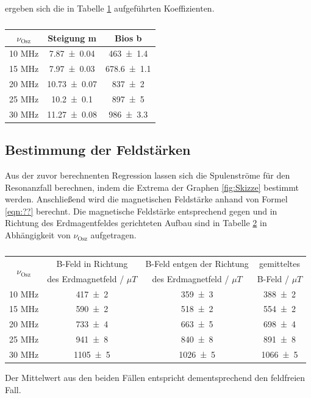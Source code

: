 ergeben sich die in Tabelle \ref{tab:stei} aufgeführten Koeffizienten. 
\begin{table}
  \centering
  \caption{}
  \begin{tabular}{c|c c}
    \toprule
    	$\nu_\text{Osz}$ & Steigung m & Bios b \\
    \midrule
       	10 MHz & \num{7.87 +- 0.04}  & \num{463 +- 1.4} \\
	15 MHz & \num{7.97 +- 0.03}  & \num{678.6 +- 1.1} \\ 
	20 MHz & \num{10.73 +- 0.07} & \num{837 +- 2} \\
	25 MHz & \num{10.2 +- 0.1}   & \num{897 +- 5} \\
	30 MHz & \num{11.27 +- 0.08} & \num{986 +- 3.3}\\
    \bottomrule
  \end{tabular}
  \label{tab:stei}
\end{table}

\subsection{Bestimmung der Feldstärken}
Aus der zuvor berechnenten Regression lassen sich die Spulenströme für den Resonanzfall berechnen, indem die Extrema der Graphen \ref{fig:Skizze} bestimmt werden. Anschließend wird die magnetischen Feldstärke anhand von Formel \ref{eqn:??} berechnt. Die magnetische Feldstärke entsprechend gegen und in Richtung des Erdmagentfeldes gerichteten Aufbau sind in Tabelle \ref{tab:magn} in Abhängigkeit von $\nu_\text{Osz}$ aufgetragen.  
\begin{table}
  \centering
  \caption{}
  \begin{tabular}{c|c c c}
    \toprule
    \multirow{2}{*}{$\nu_\text{Osz}$} & B-Feld in Richtung & B-Feld entgen der Richtung & gemitteltes \\
    	& des Erdmagnetfeld / $\mu T$ & des Erdmagnetfeld / $\mu T$ & B-Feld / $\mu T$ \\
    \midrule
       	10 MHz & \num{417 +- 2} & \num{359 +- 3} & \num{388 +- 2} \\
	15 MHz & \num{590 +- 2} & \num{518 +- 2} & \num{554 +- 2} \\ 
	20 MHz & \num{733 +- 4} & \num{663 +- 5} & \num{698 +- 4} \\
	25 MHz & \num{941 +- 8} & \num{840 +- 8} & \num{891 +- 8} \\
	30 MHz & \num{1105 +- 5} & \num{1026 +- 5} & \num{1066 +- 5} \\
    \bottomrule
  \end{tabular}
  \label{tab:magn}
\end{table}
Der Mittelwert aus den beiden Fällen entspricht dementsprechend den feldfreien Fall. 
